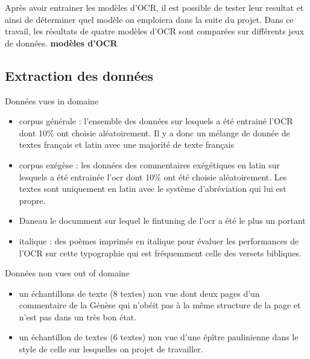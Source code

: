 \documentclass[11pt,french]{article}
\begin{document}
Après avoir entrainer les modèles d'OCR, il est possible de tester leur resultat et ainsi de déterminer quel modèle on emploiera dans la suite du projet. Dans ce travail, les résultats de quatre modèles d'OCR sont comparées sur différents jeux de données. 
\textbf{modèles d'OCR}

\subsection{Extraction des données}

Données vues in domaine  
\begin{itemize}
    \item corpus générale : l'ensemble des données sur lesquels a été entrainé l'OCR dont 10\% ont choisie aléatoirement. Il y a donc un mélange de donnée de textes français et latin avec une majorité de texte français
    \item corpus exégèse : les données des commentaires exégétiques en latin sur lesquels a été entrainée l'ocr dont 10\% ont été choisie aléatoirement. Les textes sont uniquement en latin avec le système d'abréviation qui lui est propre.\\ 
     \item Daneau le documment sur lequel le fintuning de l'ocr a été le plus un portant
    \item  italique : des poèmes imprimés en italique pour évaluer les performances de l'OCR sur cette typographie qui est fréquemment celle des versets bibliques.
\end{itemize}
Données non vues out of domaine
\begin{itemize}
    \item un échantillons de texte (8 textes) non vue dont deux pages d'un commentaire de la Génèse qui n'obéit pas à la même structure de la page et n'est pas dans un très bon état. 
    \item un échantillon de textes (6 textes) non vue d'une épître paulinienne dans le style de celle sur lesquelles on projet de travailler.
\end{itemize}
\end{document}
